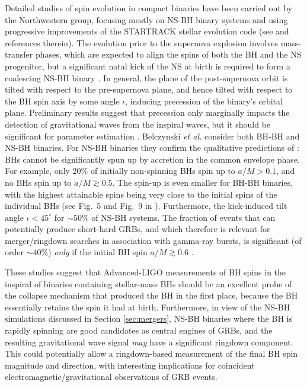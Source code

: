 \documentclass[]{iopart}
\begin{document}
Detailed studies of spin evolution in compact binaries have been carried out
by the Northwestern group, focusing mostly on NS-BH binary systems and using
progressive improvements of the STARTRACK stellar evolution code (see
\cite{Belczynski:2007xg} and references therein).  The evolution prior to the
supernova explosion involves mass-transfer phases, which are expected to align
the spins of both the BH and the NS progenitor, but a significant natal kick
of the NS at birth is required to form a coalescing NS-BH binary
\cite{Kalogera:1999tq}. In general, the plane of the post-supernova orbit is
tilted with respect to the pre-supernova plane, and hence tilted with respect
to the BH spin axis by some angle $\iota$, inducing precession of the binary's
orbital plane. Preliminary results suggest that precession only marginally
impacts the detection of gravitational waves from the inspiral waves, but it
should be significant for parameter estimation
\cite{O'Shaughnessy:2005qc,Belczynski:2007xg,Grandclement:2003ck}.
%
Belczynski {\it et al.} \cite{Belczynski:2007xg} consider both BH-BH and NS-BH
binaries. For NS-BH binaries they confirm the qualitative predictions of
\cite{King:1999aq}: BHs cannot be significantly spun up by accretion in the
common envelope phase. For example, only 20\% of initially non-spinning BHs
spin up to $a/M>0.1$, and no BHs spin up to $a/M\gtrsim 0.5$. The spin-up is
even smaller for BH-BH binaries, with the highest attainable spins being very
close to the initial spins of the individual BHs (see Fig.~5 and Fig.~9 in
\cite{Belczynski:2007xg}). Furthermore, the kick-induced tilt angle
$\iota<45^\circ$ for $\sim 50\%$ of NS-BH systems. The fraction of events that
can potentially produce short-hard GRBs, and which therefore is relevant for
merger/ringdown searches in association with gamma-ray bursts, is significant
(of order $\sim 40\%$) {\it only} if the initial BH spin $a/M\gtrsim 0.6$
\cite{Belczynski:2007xg}.

These studies suggest that Advanced-LIGO measurements of BH spins in the
inspiral of binaries containing stellar-mass BHs should be an excellent probe
of the collapse mechanism that produced the BH in the first place, because the
BH essentially retains the spin it had at birth. Furthermore, in view of the
NS-BH simulations discussed in Section \ref{sec:mergers}, NS-BH binaries where
the BH is rapidly spinning are good candidates as central engines of GRBs, and
the resulting gravitational wave signal {\em may} have a significant ringdown
component.  This could potentially allow a ringdown-based measurement of the
final BH spin magnitude and direction, with interesting implications for
coincident electromagnetic/gravitational observations of GRB events.
\end{document}
